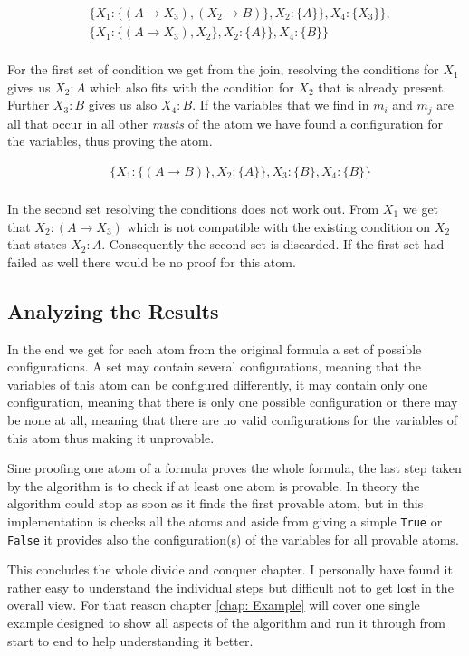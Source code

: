 \begin{align*}
	& \{	X_1: \{(A \rightarrow X_3), (X_2 \rightarrow B)\}, 
						X_2: \{A\}\}, 
						X_4: \{X_3\}\},\\
					& \{X_1: \{(A \rightarrow X_3), X_2\},
						X_2: \{A\}\}, 
						X_4: \{B\}\}\\
\end{align*}



For the first set of condition we get from the join, resolving the conditions for $X_1$ gives us $X_2:A$ which also fits with the condition for $X_2$ that is already present. Further $X_3: B$ gives us also $X_4: B$. If the variables that we find in $m_i$ and $m_j$ are all that occur in all other \emph{musts} of the atom we have found a configuration for the variables, thus proving the atom.

\begin{align*}
	& \{X_1: \{(A \rightarrow B)\}, X_2: \{A\}\}, X_3: \{B\}, X_4: \{B\}\}\\
\end{align*}

In the second set resolving the conditions does not work out. From $X_1$ we get that $X_2: (A \rightarrow X_3)$ which is not compatible with the existing condition on $X_2$ that states $X_2: A$. Consequently the second set is discarded. If the first set had failed as well there would be no proof for this atom.


\subsection{Analyzing the Results}
In the end we get for each atom from the original formula a set of possible configurations. A set may contain several configurations, meaning that the variables of this atom can be configured differently, it may contain only one configuration, meaning that there is only one possible configuration or there may be none at all, meaning that there are no valid configurations for the variables of this atom thus making it unprovable.

Sine proofing one atom of a formula proves the whole formula, the last step taken by the algorithm is to check if at least one atom is provable. In theory the algorithm could stop as soon as it finds the first provable atom, but in this implementation is checks all the atoms and aside from giving a simple \texttt{True} or \texttt{False} it provides also the configuration(s) of the variables for all provable atoms.



\bigskip
\par This concludes the whole divide and conquer chapter. I personally have found it rather easy to understand the individual steps but difficult not to get lost in the overall view. For that reason chapter \ref{chap: Example} will cover one single example designed to show all aspects of the algorithm and run it through from start to end to help understanding it better.

